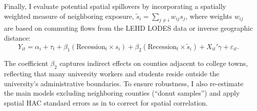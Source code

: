 Finally, I evaluate potential spatial spillovers by incorporating a spatially weighted measure of neighboring exposure, $\tilde{s}_i = \sum_{j\neq i}w_{ij}s_j$, where weights $w_{ij}$ are based on commuting flows from the LEHD LODES data or inverse geographic distance:
\begin{equation}
	\label{eq:spill}
	Y_{it} = \alpha_i + \tau_t + \beta_1(\text{Recession}_t \times s_i) + \beta_2(\text{Recession}_t \times \tilde{s}_i) + X_{it}'\gamma + \varepsilon_{it}.
\end{equation}

The coefficient $\beta_2$ captures indirect effects on counties adjacent to college towns, reflecting that many university workers and students reside outside the university’s administrative boundaries. To ensure robustness, I also re-estimate the main models excluding neighboring counties (“donut samples”) and apply spatial HAC standard errors as in \citet{conley1999gmm} to correct for spatial correlation.



